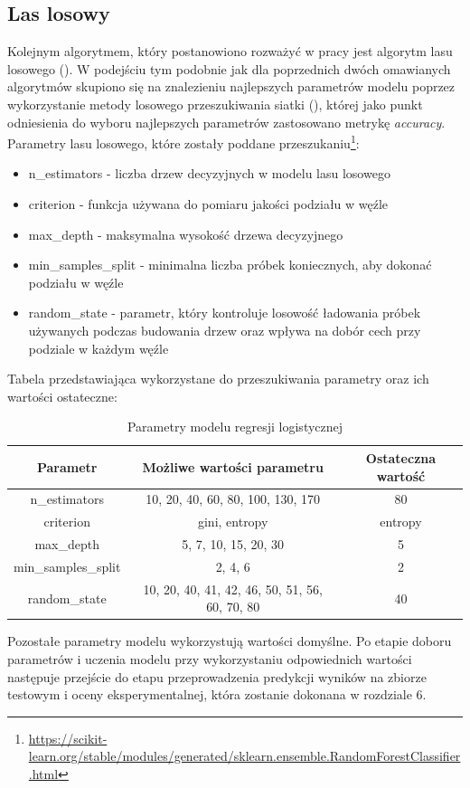         \subsection{Las losowy}
        \label{tab:params_rf}
        \noindent Kolejnym algorytmem, który postanowiono rozważyć w pracy jest algorytm lasu losowego (). W podejściu tym podobnie jak dla poprzednich dwóch omawianych algorytmów skupiono się na znalezieniu najlepszych parametrów modelu poprzez wykorzystanie metody losowego przeszukiwania siatki (), której jako punkt odniesienia do wyboru najlepszych parametrów zastosowano metrykę \textit{accuracy}. Parametry lasu losowego, które zostały poddane przeszukaniu\footnote{\url{https://scikit-learn.org/stable/modules/generated/sklearn.ensemble.RandomForestClassifier.html}}:
        \begin{itemize}
            \item n\_estimators - liczba drzew decyzyjnych w modelu lasu losowego
            \item criterion - funkcja używana do pomiaru jakości podziału w węźle
            \item max\_depth - maksymalna wysokość drzewa decyzyjnego
            \item min\_samples\_split - minimalna liczba próbek koniecznych, aby dokonać podziału w węźle
            \item random\_state - parametr, który kontroluje losowość ładowania próbek używanych podczas budowania drzew oraz wpływa na dobór cech przy podziale w każdym węźle
        \end{itemize}
        Tabela przedstawiająca wykorzystane do przeszukiwania parametry oraz ich wartości ostateczne:
        \begin{table}[H]
        \caption{Parametry modelu regresji logistycznej}
        \centering
        \begin{tabular}{c c c}
        \toprule
            Parametr & Możliwe wartości parametru & Ostateczna wartość \\
        \midrule
            n\_estimators & 10, 20, 40, 60, 80, 100, 130, 170 & 80 \\
            criterion & gini, entropy & entropy \\
            max\_depth & 5, 7, 10, 15, 20, 30 & 5 \\
            min\_samples\_split & 2, 4, 6 & 2\\
            random\_state & 10, 20, 40, 41, 42, 46, 50, 51, 56, 60, 70, 80 & 40 \\
        \bottomrule
        \end{tabular}
        \end{table}
        Pozostałe parametry modelu wykorzystują wartości domyślne. Po etapie doboru parametrów i uczenia modelu przy wykorzystaniu odpowiednich wartości następuje przejście do etapu przeprowadzenia predykcji wyników na zbiorze testowym i oceny eksperymentalnej, która zostanie dokonana w rozdziale 6.

